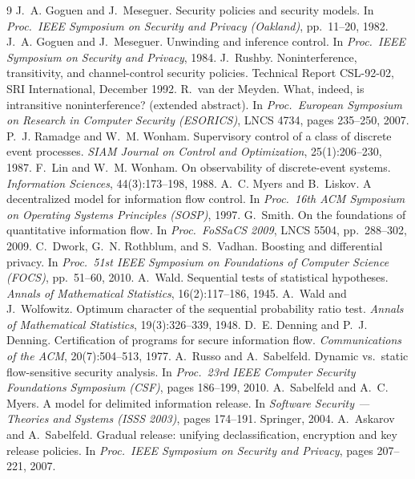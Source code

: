 \documentclass[11pt,a4paper]{article}
\begin{document}
\begin{thebibliography}{9}
 J.~A. Goguen and J.~Meseguer. Security policies and security models. In
\emph{Proc.\ IEEE Symposium on Security and Privacy (Oakland)}, pp.~11--20, 1982.
 J.~A. Goguen and J.~Meseguer. Unwinding and inference control. In
\emph{Proc.\ IEEE Symposium on Security and Privacy}, 1984.
 J.~Rushby. Noninterference, transitivity, and channel-control security policies.
Technical Report CSL-92-02, SRI International, December 1992.
 R.~van der Meyden. What, indeed, is intransitive noninterference? (extended abstract). In
\emph{Proc.\ European Symposium on Research in Computer Security (ESORICS)}, LNCS 4734, pages 235--250, 2007.
 P.~J. Ramadge and W.~M. Wonham. Supervisory control of a class of discrete
event processes. \emph{SIAM Journal on Control and Optimization}, 25(1):206--230, 1987.
 F.~Lin and W.~M. Wonham. On observability of discrete-event systems.
\emph{Information Sciences}, 44(3):173--198, 1988.
 A.~C. Myers and B.~Liskov. A decentralized model for information flow
control. In \emph{Proc.\ 16th ACM Symposium on Operating Systems Principles (SOSP)}, 1997.
 G.~Smith. On the foundations of quantitative information flow. In \emph{Proc.\
FoSSaCS 2009}, LNCS 5504, pp.~288--302, 2009.
 C.~Dwork, G.~N. Rothblum, and S.~Vadhan. Boosting and differential privacy. In
\emph{Proc.\ 51st IEEE Symposium on Foundations of Computer Science (FOCS)}, pp.~51--60, 2010.
\bibitem{wald} A.~Wald. Sequential tests of statistical hypotheses. \emph{Annals of Mathematical
Statistics}, 16(2):117--186, 1945.
 A.~Wald and J.~Wolfowitz. Optimum character of the sequential probability
ratio test. \emph{Annals of Mathematical Statistics}, 19(3):326--339, 1948.
\bibitem{denning77} D.~E. Denning and P.~J. Denning. Certification of programs for secure
information flow. \emph{Communications of the ACM}, 20(7):504--513, 1977.
\bibitem{rs10} A.~Russo and A.~Sabelfeld. Dynamic vs.\ static flow-sensitive security analysis. In
\emph{Proc.\ 23rd IEEE Computer Security Foundations Symposium (CSF)}, pages 186--199, 2010.
\bibitem{sm03} A.~Sabelfeld and A.~C. Myers. A model for delimited information release. In
\emph{Software Security --- Theories and Systems (ISSS 2003)}, pages 174--191. Springer, 2004.
\bibitem{as07} A.~Askarov and A.~Sabelfeld. Gradual release: unifying declassification, encryption
and key release policies. In \emph{Proc.\ IEEE Symposium on Security and Privacy}, pages 207--221, 2007.

\end{thebibliography}
\end{document}
